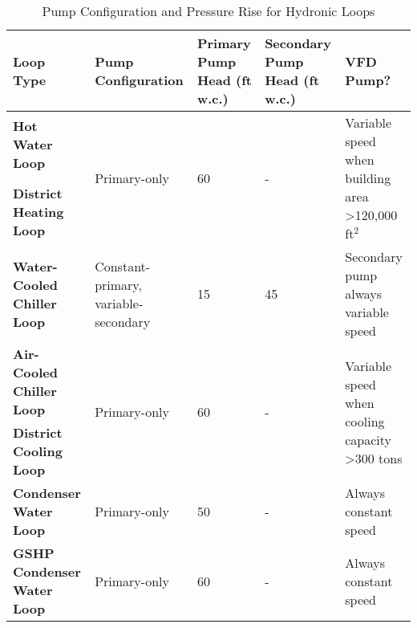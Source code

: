 \begin{table}[h!]
\centering
\small
\caption{Pump Configuration and Pressure Rise for Hydronic Loops}
\label{tab:pumps}
\begin{tabular}{|p{2.5cm}|p{2.5cm}|p{2.5cm}|p{2.5cm}|p{2.5cm}|}
\hline
\textbf{Loop Type} &
  \textbf{Pump Configuration} &
  \textbf{Primary Pump Head (ft w.c.)} &
  \textbf{Secondary Pump Head (ft w.c.)} &
  \textbf{VFD Pump?} \\ \hline
\textbf{Hot Water Loop} &
  \multirow{2}{*}{Primary-only} &
  \multirow{2}{*}{60} &
  \multirow{2}{*}{-} &
  \multirow{2}{*}{\parbox{2.5cm}{Variable speed when building area \textgreater{}120,000 ft$^2$}} \\
\textbf{District   Heating Loop} &
   &
   &
   &
   \\ \hline
\textbf{Water-Cooled   Chiller Loop} &
  Constant-primary,   variable-secondary &
  15 &
  45 &
  Secondary pump always variable speed \\ \hline
\textbf{Air-Cooled   Chiller Loop} &
  \multirow{2}{*}{Primary-only} &
  \multirow{2}{*}{60} &
  \multirow{2}{*}{-} &
  \multirow{2}{*}{\parbox{2.5cm}{Variable speed when cooling capacity \textgreater{}300 tons}} \\
\textbf{District   Cooling Loop} &
   &
   &
   &
   \\ \hline
\textbf{Condenser   Water Loop} &
  Primary-only &
  50 &
  - &
  Always constant speed \\ \hline
\textbf{GSHP Condenser   Water Loop} &
  Primary-only &
  60 &
  - &
  Always constant speed \\ \hline
\end{tabular}
\end{table}